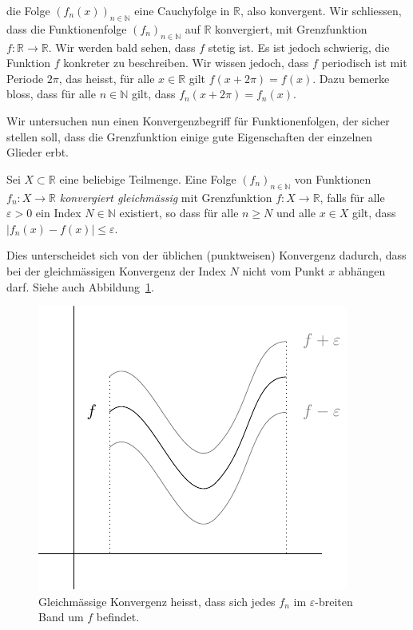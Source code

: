 \documentclass[../main.tex]{subfiles}
\begin{document}
\begin{examples}
\begin{enumerate}[(1)]
      die Folge ${(f_{n}(x))}_{n \in \mathbb{N}}$
      eine Cauchyfolge in $\mathbb{R}$,
      also konvergent.
      Wir schliessen, dass die Funktionenfolge
      ${(f_{n})}_{n \in \mathbb{N}}$ auf $\mathbb{R}$ 
      konvergiert, mit Grenzfunktion
      $f \colon \mathbb{R} \to \mathbb{R}$.
      Wir werden bald sehen, dass $f$ stetig ist.
      Es ist jedoch schwierig, die Funktion
      $f$ konkreter zu beschreiben. Wir wissen jedoch,
      dass $f$ periodisch ist mit Periode $2\pi$,
      das heisst, für alle $x \in \mathbb{R}$ gilt
      $f(x + 2\pi) = f(x)$.
      Dazu bemerke bloss, dass für alle $n \in \mathbb{N}$ 
      gilt, dass $f_n(x + 2 \pi) = f_n(x)$.
  \end{enumerate}
\end{examples}

Wir untersuchen nun einen Konvergenzbegriff für Funktionenfolgen,
der sicher stellen soll, dass die Grenzfunktion einige gute Eigenschaften
der einzelnen Glieder erbt.

\begin{definition}
  Sei $X \subset \mathbb{R}$ eine beliebige Teilmenge.
  Eine Folge ${(f_{n})}_{n \in \mathbb{N}}$ von Funktionen $f_n \colon X \to \mathbb{R}$
  \emph{konvergiert gleichmässig} mit Grenzfunktion $f \colon X \to \mathbb{R}$,
  falls für alle $\varepsilon > 0$ ein Index $N \in \mathbb{N}$ existiert,
  so dass für alle $n \geq N$ und alle $x \in X$ gilt, dass
  $|f_n(x) - f(x)| \leq \varepsilon$.
\end{definition}

Dies unterscheidet sich von der üblichen (punktweisen) Konvergenz dadurch,
dass bei der gleichmässigen Konvergenz der Index $N$ nicht vom Punkt $x$ abhängen darf.
Siehe auch Abbildung~\ref{fig:uniform}.

\begin{figure}[htb]
  \centering
  \includegraphics{images/uniform}
  \caption{Gleichmässige Konvergenz heisst, dass sich jedes
  $f_n$ im $\varepsilon$-breiten Band um $f$ befindet.}%
  \label{fig:uniform}
\end{figure}
\end{document}
